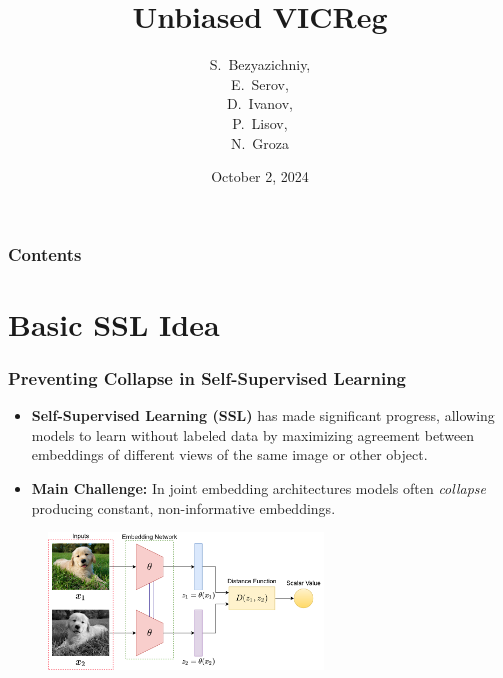 \documentclass[13pt,aspectratio=169]{beamer}
\title{Unbiased VICReg}
\author{S.~Bezyazichniy, \\E.~Serov, \\D.~Ivanov, \\P.~Lisov, \\N.~Groza}
\institute{MIPT}
\date{October 2, 2024}
\begin{document}
\begin{frame}
  \titlepage
\end{frame}

\begin{frame}
	\frametitle{Contents}
	\tableofcontents
\end{frame}

\section{Basic SSL Idea}
\begin{frame}
  \frametitle{Preventing Collapse in Self-Supervised Learning}
  \begin{itemize}
    \item \textbf{Self-Supervised Learning (SSL)} has made
      significant progress, allowing models to learn without
      labeled data by maximizing agreement between embeddings
      of different views of the same image or other object.
    \item \textbf{Main Challenge:} In joint embedding architectures
      models often \textit{collapse} producing constant, non-informative
      embeddings.
  \end{itemize}

  \begin{figure}
      \begin{center}
  	    \includegraphics[width=0.65\textwidth]{imgs/je_architecture.png}
      \end{center}
  \end{figure}
  
\end{frame}
\end{document}
